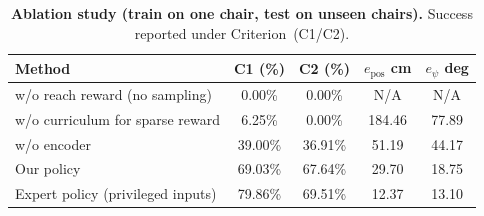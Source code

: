 \begin{table}[ht]
\centering
\caption{\textbf{Ablation study (train on one chair, test on unseen chairs).} Success reported under Criterion~(C1/C2).}
\label{tab:policy_comparison}
\scriptsize
\setlength{\tabcolsep}{3.2pt}
\renewcommand{\arraystretch}{1.35}
\begin{tabular}{p{4.25cm}cccc}
\toprule
\textbf{Method} & \textbf{C1 (\%)} & \textbf{C2 (\%)} & \textbf{$e_{\text{pos}}$ cm} & \textbf{$e_{\psi}$ deg} \\
\midrule
w/o reach reward (no sampling) & 0.00\% & 0.00\% & N/A & N/A \\
w/o curriculum for sparse reward & 6.25\% & 0.00\% & 184.46 & 77.89 \\
w/o encoder & 39.00\% & 36.91\% & 51.19 & 44.17 \\
Our policy & 69.03\% & 67.64\% & 29.70 & 18.75 \\
Expert policy (privileged inputs) & 79.86\% & 69.51\% & 12.37 & 13.10 \\
\bottomrule
\end{tabular}
\vspace{-0.9em}
\end{table}






